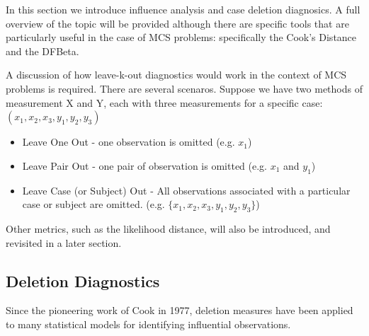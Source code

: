 \documentclass[12pt, a4paper]{report}
\theoremstyle{plain}
\theoremstyle{definition}
\theoremstyle{remark}
\begin{document}
	
	In this section we introduce influence analysis and case deletion diagnosics. A full overview of the topic will be provided although there are specific tools that are particularly useful in the case of MCS problems: specifically the Cook's Distance and the DFBeta.
	
	A discussion of how leave-k-out diagnostics would work in the context of MCS problems is required. There are several scenaros. Suppose we have two methods of measurement X and Y, each with three measurements for a specific case: $(x_1,x_2,x_3,y_1,y_2,y_3)$
	
	\begin{itemize}
		\item Leave One Out - one observation is omitted (e.g. $x_1$)
		\item Leave Pair Out - one pair of observation  is omitted (e.g. $x_1$ and $y_1$)
		\item Leave Case (or Subject) Out - All observations associated with a particular case or subject are omitted. (e.g. $\{x_1,x_2,x_3,y_1,y_2,y_3\}$)
	\end{itemize}
	Other metrics, such as the likelihood distance, will also be introduced, and revisited in a later section.
	
	
	
	
	
	
	
	
	
	\newpage
	\subsection{Deletion Diagnostics}
	
	Since the pioneering work of Cook in 1977, deletion measures have been applied to many statistical models for identifying influential observations.
	
\end{document}
